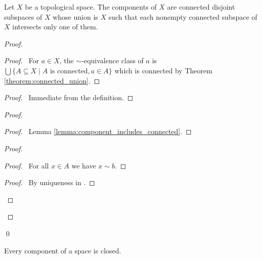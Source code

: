\begin{theorem}
    Let $X$ be a topological space. The components of $X$ are connected
    disjoint subspaces of $X$ whose union is $X$ such that each nonempty
    connected subspace of $X$ intersects only one of them.
\end{theorem}

\begin{proof}
    \pf
    \begin{proof}
        \pf\ For $a \in X$, the $\sim$-equivalence class of $a$ is
        $\bigcup \{ A \subseteq X \mid A \text{ is connected}, a \in A \}$
        which is connected by Theorem \ref{theorem:connected_union}.
    \end{proof}
    \begin{proof}
        \pf\ Immediate from the definition.
    \end{proof}
    \begin{proof}
        \begin{proof}
            \pf\ Lemma \ref{lemma:component_includes_connected}.
        \end{proof}
        \begin{proof}
            \begin{proof}
                \pf\ For all $x \in A$ we have $x \sim b$.
            \end{proof}
            \begin{proof}
                \pf\ By uniqueness in .
            \end{proof}
        \end{proof}
    \end{proof}
    \qed
\end{proof}

\begin{proposition}
    Every component of a space is closed.
\end{proposition}

